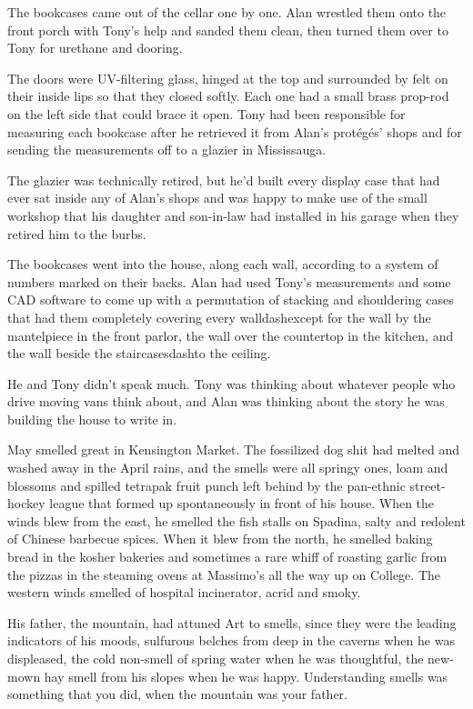 The bookcases came out of the cellar one by one.  Alan wrestled them
onto the front porch with Tony's help and sanded them clean, then
turned them over to Tony for urethane and dooring.

The doors were UV-filtering glass, hinged at the top and surrounded by
felt on their inside lips so that they closed softly.  Each one had a
small brass prop-rod on the left side that could brace it open.  Tony
had been responsible for measuring each bookcase after he retrieved it
from Alan's prot\'{e}g\'{e}s' shops and for sending the measurements off
to a glazier in Mississauga.

The glazier was technically retired, but he'd built every display case
that had ever sat inside any of Alan's shops and was happy to make use
of the small workshop that his daughter and son-in-law had installed
in his garage when they retired him to the burbs.

The bookcases went into the house, along each wall, according to a
system of numbers marked on their backs.  Alan had used Tony's
measurements and some CAD software to come up with a permutation of
stacking and shouldering cases that had them completely covering every
walldash{}except for the wall by the mantelpiece in the front parlor, the
wall over the countertop in the kitchen, and the wall beside the
staircasesdash{}to the ceiling.

He and Tony didn't speak much.  Tony was thinking about whatever
people who drive moving vans think about, and Alan was thinking about
the story he was building the house to write in.

May smelled great in Kensington Market.  The fossilized dog shit had
melted and washed away in the April rains, and the smells were all
springy ones, loam and blossoms and spilled tetrapak fruit punch left
behind by the pan-ethnic street-hockey league that formed up
spontaneously in front of his house.  When the winds blew from the
east, he smelled the fish stalls on Spadina, salty and redolent of
Chinese barbecue spices.  When it blew from the north, he smelled
baking bread in the kosher bakeries and sometimes a rare whiff of
roasting garlic from the pizzas in the steaming ovens at Massimo's all
the way up on College.  The western winds smelled of hospital
incinerator, acrid and smoky.

His father, the mountain, had attuned Art to smells, since they were
the leading indicators of his moods, sulfurous belches from deep in
the caverns when he was displeased, the cold non-smell of spring water
when he was thoughtful, the new-mown hay smell from his slopes when he
was happy.  Understanding smells was something that you did, when the
mountain was your father.

